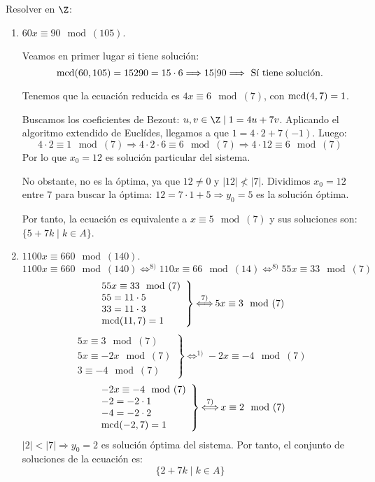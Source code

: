 \begin{ejemplo} Resolver en $\Z$:
\begin{enumerate}
    \item $60x\equiv 90\mod(105)$.

    Veamos en primer lugar si tiene solución: 
    $$\operatorname{mcd}(60,105)=15 2 90 = 15 \cdot 6 \Longrightarrow 15|90 \Longrightarrow \mbox{ Sí tiene solución.}$$

    Tenemos que la ecuación reducida es $ 4x\equiv 6\mod(7)$, con $\operatorname{mcd}(4,7) = 1$.

    Buscamos los coeficientes de Bezout: $u,v \in \Z \mid 1=4u + 7v$. Aplicando el algoritmo extendido de Euclídes, llegamos a que $1 = 4\cdot 2 + 7(-1)$. Luego:
    $$4\cdot 2\equiv 1\mod(7) \Longrightarrow 4 \cdot 2 \cdot 6\equiv 6\mod(7) \Longrightarrow 4\cdot 12\equiv 6\mod(7)$$
    Por lo que $x_0=12$ es solución particular del sistema.
    
    No obstante, no es la óptima, ya que  $12\neq 0$ y $|12| \not < |7|$. Dividimos $x_0=12$ entre $7$ para buscar la óptima: $12=7\cdot 1 + 5 \Longrightarrow y_0=5$ es la solución óptima.
        
    Por tanto, la ecuación es equivalente a $x\equiv 5\mod(7)$ y sus soluciones son: $\{5+7k \mid k \in A\}$.

    \item $1100x\equiv 660\mod(140)$.
    $$1100x\equiv 660\mod(140) \mathop{\Longleftrightarrow}^{8)} 110x\equiv 66\mod(14)
        \mathop{\Longleftrightarrow}^{8)} 55x\equiv 33\mod(7)$$
    $$\left. \begin{array}{l}
            55x\equiv 33\mod(7) \\
            55 = 11\cdot 5      \\
            33 = 11\cdot 3      \\
            \operatorname{mcd}(11,7) = 1
        \end{array} \right\} \mathop{\Longleftrightarrow}^{7)} 5x\equiv 3\mod(7)$$
    $$\left. \begin{array}{l}
            5x\equiv 3\mod(7)   \\
            5x\equiv -2x\mod(7) \\
            3\equiv -4\mod(7)
        \end{array} \right\} \mathop{\Longleftrightarrow}^{1)} -2x\equiv -4\mod(7)$$
    $$\left. \begin{array}{l}
            -2x\equiv -4\mod(7) \\
            -2 = -2 \cdot 1     \\
            -4 = -2 \cdot 2     \\
            \operatorname{mcd}(-2,7)=1
        \end{array}\right\} \mathop{\Longleftrightarrow}^{7)} x\equiv 2 \mod(7)$$
    $|2|<|7| \Longrightarrow y_0=2$ es solución óptima del sistema. Por tanto, el conjunto de soluciones de la ecuación es:
    $$\{2 + 7k \mid k \in A\}$$


\end{enumerate}
\end{ejemplo}
